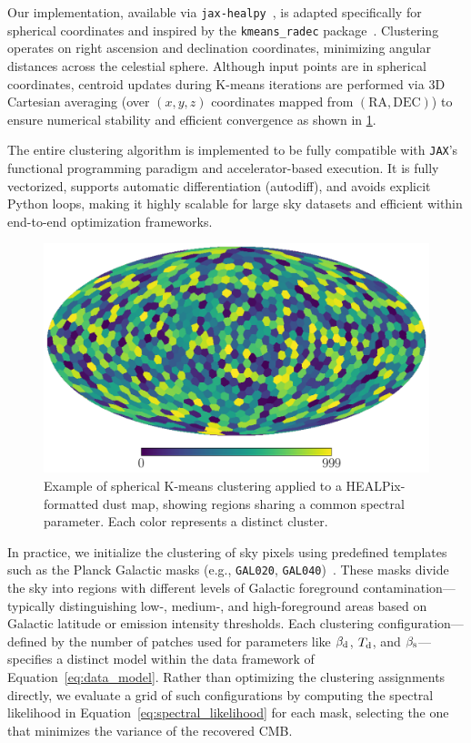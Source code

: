 \documentclass[fleqn,usenatbib]{mnras}
\begin{document}
Our implementation, available via \texttt{jax-healpy}~\citep{JAXHEALPY}, is adapted specifically for spherical coordinates and inspired by the \texttt{kmeans\_radec} package~\citep{KMEANSRADEC}. Clustering operates on right ascension and declination coordinates, minimizing angular distances across the celestial sphere. Although input points are in spherical coordinates, centroid updates during K-means iterations are performed via 3D Cartesian averaging (over \((x, y, z)\) coordinates mapped from \((\text{RA}, \text{DEC})\)) to ensure numerical stability and efficient convergence as shown in \ref{fig:kmeans_clusters}.

The entire clustering algorithm is implemented to be fully compatible with \texttt{JAX}'s functional programming paradigm and accelerator-based execution. It is fully vectorized, supports automatic differentiation (autodiff), and avoids explicit Python loops, making it highly scalable for large sky datasets and efficient within end-to-end optimization frameworks.


\begin{figure}
    \centering
    \includegraphics[width=\linewidth]{figures/kmeans_clustering.pdf}
    \caption{Example of spherical K-means clustering applied to a HEALPix-formatted dust map, showing regions sharing a common spectral parameter. Each color represents a distinct cluster.}
    \label{fig:kmeans_clusters}
\end{figure}


In practice, we initialize the clustering of sky pixels using predefined templates such as the Planck Galactic masks (e.g., \texttt{GAL020}, \texttt{GAL040})~\citep{PLANCK}. These masks divide the sky into regions with different levels of Galactic foreground contamination—typically distinguishing low-, medium-, and high-foreground areas based on Galactic latitude or emission intensity thresholds.
Each clustering configuration—defined by the number of patches used for parameters like \( \beta_{\rm d} \), \( T_{\rm d} \), and \( \beta_{\rm s} \)—specifies a distinct model within the data framework of Equation~\eqref{eq:data_model}. Rather than optimizing the clustering assignments directly, we evaluate a grid of such configurations by computing the spectral likelihood in Equation~\eqref{eq:spectral_likelihood} for each mask, selecting the one that minimizes the variance of the recovered CMB.
\end{document}
